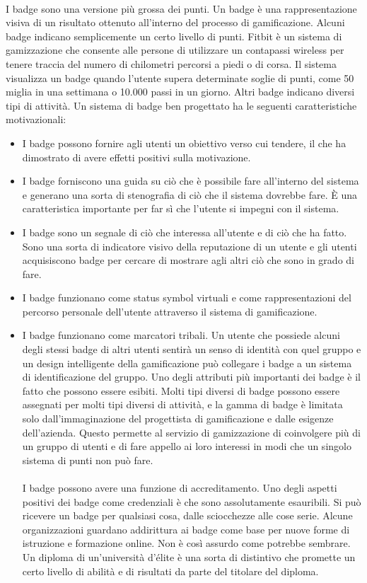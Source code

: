 \\
I badge sono una versione più grossa dei punti. Un badge è una rappresentazione visiva di un risultato ottenuto all'interno del processo di gamificazione. Alcuni badge indicano semplicemente un certo livello di punti. Fitbit è un sistema di gamizzazione che consente alle persone di utilizzare un contapassi wireless per tenere traccia del numero di chilometri percorsi a piedi o di corsa. Il sistema visualizza un badge quando l'utente supera determinate soglie di punti, come 50 miglia in una settimana o 10.000 passi in un giorno.
Altri badge indicano diversi tipi di attività.
Un sistema di badge ben progettato ha le seguenti caratteristiche motivazionali:
\begin{itemize}
\item I badge possono fornire agli utenti un obiettivo verso cui tendere, il che ha dimostrato di avere effetti positivi sulla motivazione.
\item I badge forniscono una guida su ciò che è possibile fare all'interno del sistema e generano una sorta di stenografia di ciò che il sistema dovrebbe fare.
È una caratteristica importante per far sì che l'utente si impegni con il sistema.
\item I badge sono un segnale di ciò che interessa all'utente e di ciò che ha fatto.
Sono una sorta di indicatore visivo della reputazione di un utente e gli utenti acquisiscono badge per cercare di mostrare agli altri ciò che sono in grado di fare.
\item I badge funzionano come status symbol virtuali e come rappresentazioni del percorso personale dell'utente attraverso il sistema di gamificazione.
\item I badge funzionano come marcatori tribali. Un utente che possiede alcuni degli stessi badge di altri utenti sentirà un senso di identità con quel gruppo e un design intelligente della gamificazione può collegare i badge a un sistema di identificazione del gruppo.
Uno degli attributi più importanti dei badge è il fatto che possono essere esibiti. Molti tipi diversi di badge possono essere assegnati per molti tipi diversi di attività, e la gamma di badge è limitata solo dall'immaginazione del progettista di gamificazione e dalle esigenze dell'azienda.
Questo permette al servizio di gamizzazione di coinvolgere più di un gruppo di utenti e di fare appello ai loro interessi in modi che un singolo sistema di punti non può fare.\\
\\
I badge possono avere una funzione di accreditamento. Uno degli aspetti positivi dei badge come credenziali è che sono assolutamente esauribili. Si può ricevere un badge per qualsiasi cosa, dalle sciocchezze alle cose serie. Alcune organizzazioni guardano addirittura ai badge come base per nuove forme di istruzione e formazione online. Non è così assurdo come potrebbe sembrare. Un diploma di un'università d'élite è una sorta di distintivo che promette un certo livello di abilità e di risultati da parte del titolare del diploma.\\

\end{itemize}
